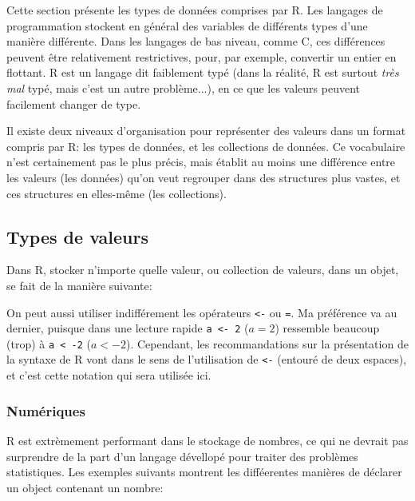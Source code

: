 Cette section présente les types de données comprises par R.
Les langages de programmation stockent en général des variables de différents types d'une manière différente.
Dans les langages de bas niveau, comme C, ces différences peuvent être relativement restrictives, pour, par exemple, convertir un entier en flottant.
R est un langage dit faiblement typé (dans la réalité, R est surtout \emph{très mal} typé, mais c'est un autre problème...), en ce que les valeurs peuvent facilement changer de type.


Il existe deux niveaux d'organisation pour représenter des valeurs dans un format compris par R: les types de données, et les collections de données.
Ce vocabulaire n'est certainement pas le plus précis, mais établit au moins une différence entre les valeurs (les données) qu'on veut regrouper dans des structures plus vastes, et ces structures en elles-même (les collections).

\subsection{Types de valeurs}

Dans R, stocker n'importe quelle valeur, ou collection de valeurs, dans un objet, se fait de la manière suivante:

\begin{knitrout}
\color{fgcolor}\begin{kframe}
\begin{flushleft}
\ttfamily\noindent
{}\hlassignement{\usebox{\hlnormalsizeboxlessthan}-}{\ }\mbox{}
\normalfont
\end{flushleft}
\end{kframe}
\end{knitrout}


On peut aussi utiliser indifférement les opérateurs \texttt{<-} ou \texttt{=}.
Ma préférence va au dernier, puisque dans une lecture rapide \texttt{a <- 2} ($a = 2$) ressemble beaucoup (trop) à \texttt{a < -2} ($a < -2$).
Cependant, les recommandations sur la présentation de la syntaxe de R vont dans le sens de l'utilisation de \texttt{<-} (entouré de deux espaces), et c'est cette notation qui sera utilisée ici.

\subsubsection{Numériques}

R est extrèmement performant dans le stockage de nombres, ce qui ne devrait pas surprendre de la part d'un langage dévellopé pour traiter des problèmes statistiques.
Les exemples suivants montrent les difféerentes manières de déclarer un object contenant un nombre:

